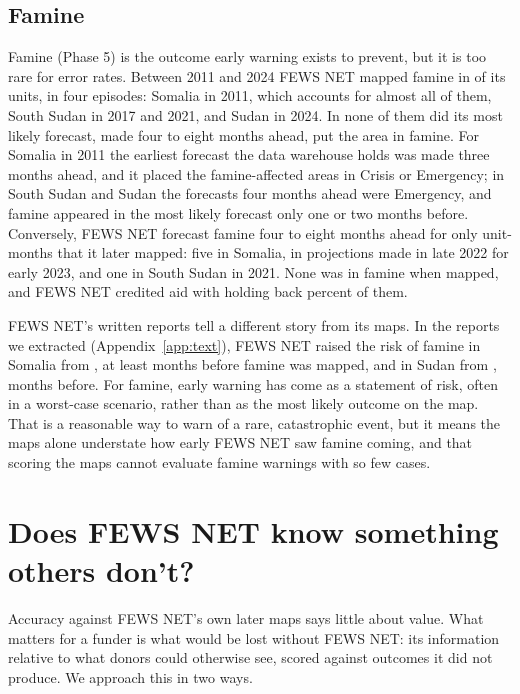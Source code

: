 \documentclass[11pt]{article}
\begin{document}
\subsection{Famine}\label{sec:famine}

Famine (Phase 5) is the outcome early warning exists to prevent, but it is too rare for error rates. Between 2011 and 2024 FEWS NET mapped famine in \famMappedUnits{} of its units, in four episodes: Somalia in 2011, which accounts for almost all of them, South Sudan in 2017 and 2021, and Sudan in 2024. In none of them did its most likely forecast, made four to eight months ahead, put the area in famine. For Somalia in 2011 the earliest forecast the data warehouse holds was made three months ahead, and it placed the famine-affected areas in Crisis or Emergency; in South Sudan and Sudan the forecasts four months ahead were Emergency, and famine appeared in the most likely forecast only one or two months before. Conversely, FEWS NET forecast famine four to eight months ahead for only \famWarn{} unit-months that it later mapped: five in Somalia, in projections made in late 2022 for early 2023, and one in South Sudan in 2021. None was in famine when mapped, and FEWS NET credited aid with holding back \famFlag{} percent of them.

FEWS NET's written reports tell a different story from its maps. In the reports we extracted (Appendix~\ref{app:text}), FEWS NET raised the risk of famine in Somalia from \famRiskSo{}, at least \famRiskLeadSo{} months before famine was mapped, and in Sudan from \famRiskSd{}, \famRiskLeadSd{} months before. For famine, early warning has come as a statement of risk, often in a worst-case scenario, rather than as the most likely outcome on the map. That is a reasonable way to warn of a rare, catastrophic event, but it means the maps alone understate how early FEWS NET saw famine coming, and that scoring the maps cannot evaluate famine warnings with so few cases.



\FloatBarrier
\section{Does FEWS NET know something others don't?}\label{sec:value}

Accuracy against FEWS NET's own later maps says little about value. What matters for a funder is what would be lost without FEWS NET: its information relative to what donors could otherwise see, scored against outcomes it did not produce. We approach this in two ways.
\end{document}
